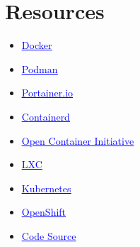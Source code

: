 \documentclass[11pt]{beamer}
\newcommand{\blue}[1]{\textcolor{blue}{#1}}
\begin{document}
\section{Resources}
\begin{frame}
	\begin{itemize}
		\item \href{https://docs.docker.com/get-started/overview/}{\blue{\underline{Docker}}}
		\item \href{https://podman.io/}{\blue{\underline{Podman}}}
		\item \href{https://www.portainer.io/}{\blue{\underline{Portainer.io}}}
		\item \href{https://containerd.io}{\blue{\underline{Containerd}}}
		\item \href{https://opencontainers.org/}{\blue{\underline{Open Container Initiative}}}
		\item \href{https://linuxcontainers.org/fr/}{\blue{\underline{LXC}}}
		\item \href{https://kubernetes.io/fr/}{\blue{\underline{Kubernetes}}}
		\item \href{https://www.openshift.com/}{\blue{\underline{OpenShift}}}
		\item \href{https://github.com/ulphidius/flask_docker_course}{\blue{\underline{Code Source}}}
	\end{itemize}

\end{frame}
\end{document}
